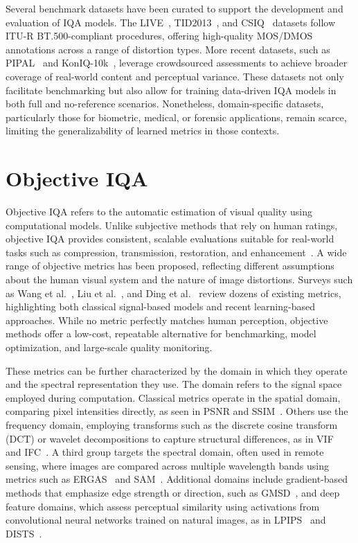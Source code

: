 Several benchmark datasets have been curated to support the development and evaluation of IQA models. The LIVE~\cite{sheikh2006image}, TID2013~\cite{pnsr2003}, and CSIQ~\cite{ma2011psnr} datasets follow ITU-R BT.500-compliant procedures, offering high-quality MOS/DMOS annotations across a range of distortion types. More recent datasets, such as PIPAL~\cite{jin2020pipal} and KonIQ-10k~\cite{mos2016}, leverage crowdsourced assessments to achieve broader coverage of real-world content and perceptual variance. These datasets not only facilitate benchmarking but also allow for training data-driven IQA models in both full and no-reference scenarios. Nonetheless, domain-specific datasets, particularly those for biometric, medical, or forensic applications, remain scarce, limiting the generalizability of learned metrics in those contexts.


\section{Objective IQA}\label{sec:objective_iqa}

Objective IQA refers to the automatic estimation of visual quality using computational models. Unlike subjective methods that rely on human ratings, objective IQA provides consistent, scalable evaluations suitable for real-world tasks such as compression, transmission, restoration, and enhancement~\cite{gonzalez2002digital, sheikh2006image}. A wide range of objective metrics has been proposed, reflecting different assumptions about the human visual system and the nature of image distortions. Surveys such as Wang et al.~\cite{wang2004image}, Liu et al.~\cite{liu2013mmf}, and Ding et al.~\cite{ding2020dists} review dozens of existing metrics, highlighting both classical signal-based models and recent learning-based approaches. While no metric perfectly matches human perception, objective methods offer a low-cost, repeatable alternative for benchmarking, model optimization, and large-scale quality monitoring.

These metrics can be further characterized by the domain in which they operate and the spectral representation they use. The domain refers to the signal space employed during computation. Classical metrics operate in the spatial domain, comparing pixel intensities directly, as seen in PSNR and SSIM~\cite{Wang2004SSIM}. Others use the frequency domain, employing transforms such as the discrete cosine transform (DCT) or wavelet decompositions to capture structural differences, as in VIF~\cite{sheikh_vif_2006} and IFC~\cite{sheikh2005ifc}. A third group targets the spectral domain, often used in remote sensing, where images are compared across multiple wavelength bands using metrics such as ERGAS~\cite{Ranchin2000ERGAS} and SAM~\cite{Kruse1993SAM}. Additional domains include gradient-based methods that emphasize edge strength or direction, such as GMSD~\cite{Xue2014GMSD}, and deep feature domains, which assess perceptual similarity using activations from convolutional neural networks trained on natural images, as in LPIPS~\cite{zhang2018lpips} and DISTS~\cite{ding2020dists}.

